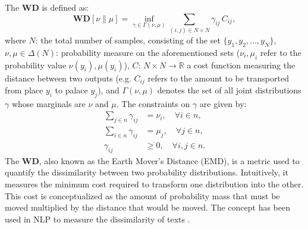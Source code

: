 The $\textbf{WD}$ \citep{wang2012coupling} is defined as:
\begin{equation}
\textbf{WD}[\nu \| \mu] = \inf_{\gamma \in \Gamma(\nu, \mu)} \sum_{(i, j) \in N \times N} \gamma_{ij} \, C_{ij},
\end{equation}
where $N$: the total number of samples, consisting of the set $\{ y_1, y_2, \dots, y_N \}$, $\nu, \mu \in \Delta(N)$: probability measure on the aforementioned sets ($\nu_i, \mu_i$ refer to the probability value $\nu(y_i), \mu(y_i)$), $C$: $N\times N \rightarrow \mathbb{R}$ a cost function measuring the distance between two outputs (e.g. $C_{ij}$ refers to the amount to
be transported from place $y_i$ to palace $y_j$), and $\Gamma(\nu, \mu)$ denotes the set of all joint distributions $\gamma$ whose marginals are $\nu$ and $\mu$. The constraints on $\gamma$ are given by:
\begin{equation*}
\begin{aligned}
\sum_{j \in n} \gamma_{ij} &= \nu_i, \quad \forall i \in n, \\
\sum_{i \in n} \gamma_{ij} &= \mu_j, \quad \forall j \in n, \\
\gamma_{ij} &\geq 0, \quad \forall i,j \in n.
\end{aligned}
\end{equation*}
The $\textbf{WD}$, also known as the Earth Mover's Distance (EMD), is a metric used to quantify the dissimilarity between two probability distributions. Intuitively, it measures the minimum cost required to transform one distribution into the other. This cost is conceptualized as the amount of probability mass that must be moved multiplied by the distance that would be moved. 
The concept has been used in NLP to measure the dissimilarity of texts \citep{pmlr-v37-kusnerb15,zhao-etal-2019-moverscore}.

